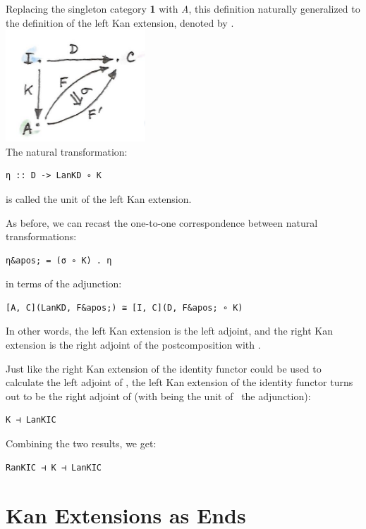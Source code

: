 Replacing the singleton category \textbf{1} with \emph{A}, this
definition naturally generalized to the definition of the left Kan
extension, denoted by .\\
\includegraphics[width=2.06250in]{images/kan12.jpg}\\
The natural transformation:

\begin{verbatim}
η :: D -> LanKD ∘ K
\end{verbatim}

is called the unit of the left Kan extension.

As before, we can recast the one-to-one correspondence between natural
transformations:

\begin{verbatim}
η&apos; = (σ ∘ K) . η
\end{verbatim}

in terms of the adjunction:

\begin{verbatim}
[A, C](LanKD, F&apos;) ≅ [I, C](D, F&apos; ∘ K)
\end{verbatim}

In other words, the left Kan extension is the left adjoint, and the
right Kan extension is the right adjoint of the postcomposition with
.

Just like the right Kan extension of the identity functor could be used
to calculate the left adjoint of , the left Kan extension of
the identity functor turns out to be the right adjoint of 
(with  being the unit of~ the adjunction):

\begin{verbatim}
K ⊣ LanKIC
\end{verbatim}

Combining the two results, we get:

\begin{verbatim}
RanKIC ⊣ K ⊣ LanKIC
\end{verbatim}

\section{Kan Extensions as Ends}\label{kan-extensions-as-ends}

